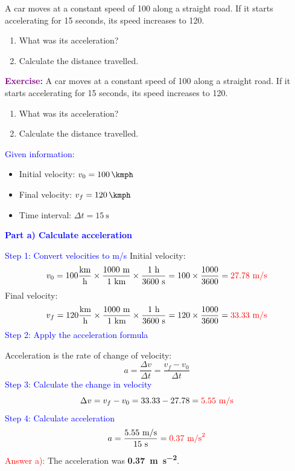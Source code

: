 \begin{exercise}
    A car moves at a constant speed of \qty{100}{\kmph} along a straight road. If it starts accelerating for 15 seconds, its speed increases to \qty{120}{\kmph}.
    \begin{enumerate}[label=\letraminuscula]
    \item What was its acceleration?
    \item Calculate the distance travelled.
    \end{enumerate}
    \begin{solu}
        \textbf{\textcolor{purple}{Exercise:}}
        A car moves at a constant speed of \qty{100}{\kmph} along a straight road.
        If it starts accelerating for 15 seconds, its speed increases to \qty{120}{\kmph}.
        \begin{enumerate}[label=\letraminuscula]
    \item What was its acceleration?
    \item Calculate the distance travelled.
        \end{enumerate}

        \vspace{0.3cm}

        \textcolor{blue}{Given information:}
        \begin{itemize}
            \item Initial velocity: $v_0 = \qty{100}{\kmph}$
            \item Final velocity: $v_f = \qty{120}{\kmph}$
            \item Time interval: $\Delta t = \qty{15}{\s}$
        \end{itemize}

        \textbf{\textcolor{blue}{Part a) Calculate acceleration}}

        \textcolor{blue}{Step 1: Convert velocities to m/s}
        Initial velocity:
        \[
            v_0 = 100 \frac{\text{km}}{\text{h}} \times \frac{1000 \text{ m}}{1 \text{ km}} \times \frac{1 \text{ h}}{3600 \text{ s}} = 100 \times \frac{1000}{3600} = \textcolor{red}{27.78 \text{ m/s}}
        \]
        Final velocity:
        \[
            v_f = 120 \frac{\text{km}}{\text{h}} \times \frac{1000 \text{ m}}{1 \text{ km}} \times \frac{1 \text{ h}}{3600 \text{ s}} = 120 \times \frac{1000}{3600} = \textcolor{red}{33.33 \text{ m/s}}
        \]
        \textcolor{blue}{Step 2: Apply the acceleration formula}

        Acceleration is the rate of change of velocity:
        \[
            \boxed{a = \frac{\Delta v}{\Delta t} = \frac{v_f - v_0}{\Delta t}}
        \]
        \textcolor{blue}{Step 3: Calculate the change in velocity}
        \[
            \Delta v = v_f - v_0 = 33.33 - 27.78 = \textcolor{red}{5.55 \text{ m/s}}
        \]
        \textcolor{blue}{Step 4: Calculate acceleration}
        \[
            a = \frac{5.55 \text{ m/s}}{15 \text{ s}} = \textcolor{red}{0.37 \text{ m/s}^2}
        \]
        \textcolor{red}{Answer a):} The acceleration was \textbf{\qty{0.37}{\metre\per\second\squared}}.


\end{solu}
\end{exercise}
